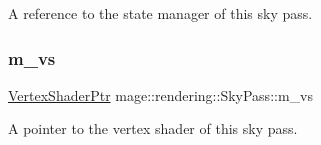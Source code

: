 A reference to the state manager of this sky pass. \hypertarget{classmage_1_1rendering_1_1_sky_pass_a935019dff57aaf9ae91f974ec59f11ee}{}\label{classmage_1_1rendering_1_1_sky_pass_a935019dff57aaf9ae91f974ec59f11ee} 
\subsubsection{\texorpdfstring{m\+\_\+vs}{m\_vs}}
{\footnotesize\ttfamily \hyperlink{namespacemage_1_1rendering_aaf704b9c54a4181f4950a1761de69dda}{Vertex\+Shader\+Ptr} mage\+::rendering\+::\+Sky\+Pass\+::m\+\_\+vs\hspace{0.3cm}{\ttfamily [private]}}

A pointer to the vertex shader of this sky pass. 